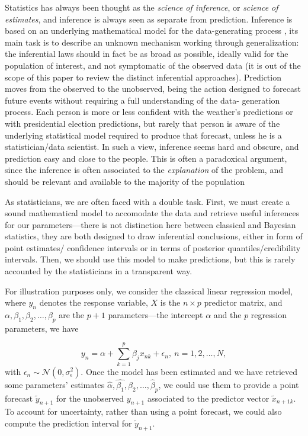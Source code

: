 \documentclass{statsoc}
\begin{document}
Statistics has always been thought as the \emph{science of inference}, or \emph{science of estimates}, and inference is always seen as separate from prediction. Inference is based on 
an underlying mathematical model for the data-generating process \citep{bzdok2018points}, its main task is to describe an unknown mechanism working through generalization: the 
inferential laws should in fact be as broad as possible, ideally valid for the population of interest, and not symptomatic of the observed data (it is out of the scope of this paper to review the distinct inferential 
approaches). Prediction moves from the observed to the unobserved, being the action designed to forecast future events without requiring a full understanding of the data-
generation process. Each person is more or less confident with the weather's predictions or with presidential election predictions, but rarely that person is aware of the underlying 
statistical model required to produce that forecast, unless he is a statistician/data scientist. In such a view, inference seems hard and obscure, and prediction easy and close 
to the people. This is often a paradoxical argument, since the inference is often associated to the \emph{explanation} of the problem, and should be relevant and available to the majority of the population

As statisticians, we are often faced with a double task. First, we must create a sound mathematical model to accomodate the data and retrieve useful inferences for our 
parameters---there is not distinction here between classical and Bayesian statistics, they are both designed to draw inferential conclusions, either in form of point estimates/
confidence intervals or in terms of posterior quantiles/credibility intervals. Then, we should use this model to make predictions, but this is rarely accounted by the statisticians in a transparent way.

For illustration purposes only, we consider the classical linear regression model, where $y_n$ denotes the response variable, $X$ is the $n \times p$ predictor matrix, and $\alpha,\beta_1,\beta_2,\ldots,\beta_p$ are the $p+1$ parameters---the intercept $\alpha$ and the $p$ regression parameters, we have

\begin{equation}
y_n = \alpha + \sum_{k=1}^p \beta_j x_{nk} + \epsilon_n, \ n=1,2,\ldots,N,
\label{eq:linear}
\end{equation}
%
with $\epsilon_n \sim \mathcal{N}(0, \sigma^2_{\epsilon})$. Once the model has been estimated and we have retrieved some parameters' estimates $\hat{\alpha}, \hat{\beta_1}, \beta_{2},\ldots,\hat{\beta}_p$, we could use them to provide a point forecast $\tilde{y}_{n+1}$ for the unobserved ${y}_{n+1}$ associated to the predictor vector $\tilde{x}_{n+1k}$. To account for uncertainty, rather than using a point forecast, we could also compute the prediction interval for $\tilde{y}_{n+1}$.
\end{document}
